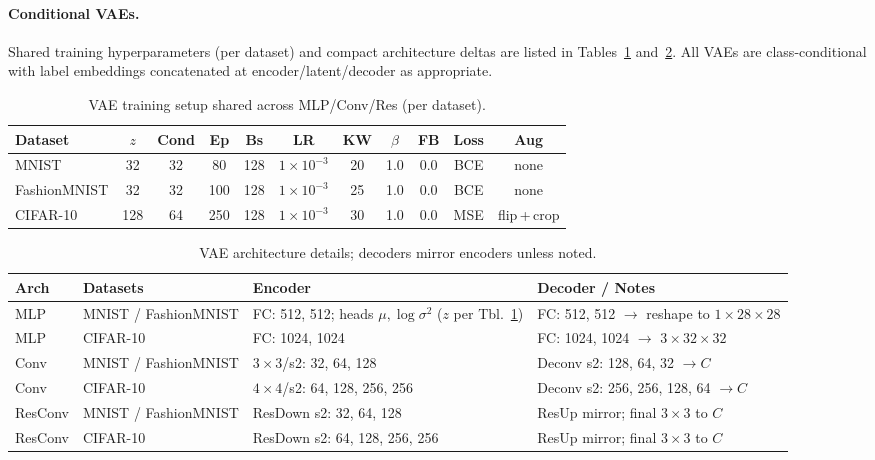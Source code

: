 \paragraph{Conditional VAEs.}
Shared training hyperparameters (per dataset) and compact architecture deltas are listed in
Tables~\ref{tab:vae-shared} and~\ref{tab:vae-arch}. All VAEs are class-conditional with label
embeddings concatenated at encoder/latent/decoder as appropriate.

\begin{table}[H]
\centering
\scriptsize
\caption{VAE training setup shared across MLP/Conv/Res (per dataset).}
\label{tab:vae-shared}
\begin{adjustbox}{max width=\linewidth}
\begin{tabularx}{\linewidth}{@{}lcccccccccc@{}}
\toprule
Dataset & $z$ & Cond & Ep & Bs & LR & KW & $\beta$ & FB & Loss & Aug \\
\midrule
MNIST        & 32  & 32 & 80  & 128 & $1\times 10^{-3}$ & 20 & 1.0 & 0.0 & BCE & none \\
FashionMNIST & 32  & 32 & 100 & 128 & $1\times 10^{-3}$ & 25 & 1.0 & 0.0 & BCE & none \\
CIFAR-10     & 128 & 64 & 250 & 128 & $1\times 10^{-3}$ & 30 & 1.0 & 0.0 & MSE & flip\,+\,crop \\
\bottomrule
\end{tabularx}
\end{adjustbox}
\end{table}


\begin{table}[H]
\centering
\scriptsize
\caption{VAE architecture details; decoders mirror encoders unless noted.}
\label{tab:vae-arch}
\begin{adjustbox}{max width=\linewidth}
\begin{tabularx}{\linewidth}{@{}l l X X@{}}
\toprule
Arch & Datasets & Encoder & Decoder / Notes \\
\midrule
MLP     & MNIST / FashionMNIST & FC: 512, 512; heads $\mu,\log\sigma^2$ ($z$ per Tbl.~\ref{tab:vae-shared}) & FC: 512, 512 $\to$ reshape to $1{\times}28{\times}28$ \\
MLP     & CIFAR-10   & FC: 1024, 1024 & FC: 1024, 1024 $\to$ $3{\times}32{\times}32$ \\
Conv    & MNIST / FashionMNIST & $3{\times}3$/s2: 32, 64, 128 & Deconv s2: 128, 64, 32 $\to C$ \\
Conv    & CIFAR-10   & $4{\times}4$/s2: 64, 128, 256, 256 & Deconv s2: 256, 256, 128, 64 $\to C$ \\
ResConv & MNIST / FashionMNIST & ResDown s2: 32, 64, 128 & ResUp mirror; final $3{\times}3$ to $C$ \\
ResConv & CIFAR-10   & ResDown s2: 64, 128, 256, 256 & ResUp mirror; final $3{\times}3$ to $C$ \\
\bottomrule
\end{tabularx}
\end{adjustbox}
\end{table}

